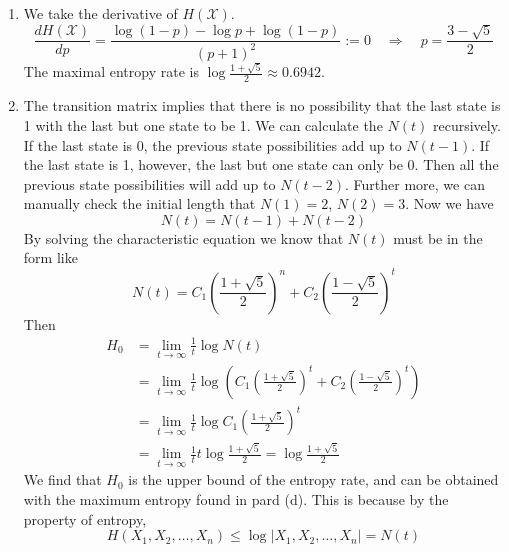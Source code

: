\begin{exercise}
\begin{solution}
\begin{enumerate}
{    }
    \item { We take the derivative of $H(\mathcal{X})$.
    \begin{equation}
        \frac{d H(\mathcal{X})}{dp} = \frac{\log(1-p) -\log p+\log(1-p)}{(p+1)^2} := 0 \quad 
        \Rightarrow \quad p =  \frac{3- \sqrt{5}}{2}
    \end{equation}
    The maximal entropy rate is $\log \frac{1+\sqrt{5}}{2} \approx 0.6942$.
    }
    \item {
      The transition matrix implies that there is no possibility that the last state is 1 with the last but one state to be 1. We can calculate the $N(t)$ recursively. If the last state is 0, the previous state possibilities add up to $N(t-1)$. If the last state is 1, however, the last but one state can only be 0. Then all the previous state possibilities will add up to $N(t-2)$. Further more, we can manually check the initial length that $N(1) = 2$, $N(2) = 3$. Now we have 
      \begin{equation}
        N(t) = N(t-1) + N(t-2)
      \end{equation}
      By solving the characteristic equation we know that $N(t)$ must be in the form like
      \begin{equation}
        N(t) = C_1 (\frac{1+\sqrt{5}}{2})^n + C_2 (\frac{1-\sqrt{5}}{2})^t
      \end{equation}
      Then
      \begin{equation}
        \begin{aligned}
          H_{0} &=\lim _{t \rightarrow \infty} \frac{1}{t} \log N(t) \\
          &= \lim _{t \rightarrow \infty} \frac{1}{t} \log \left(C_1 (\frac{1+\sqrt{5}}{2})^t + C_2 (\frac{1-\sqrt{5}}{2})^t\right) \\
          &= \lim _{t \rightarrow \infty} \frac{1}{t} \log C_1 (\frac{1+\sqrt{5}}{2})^t \\
          &= \lim _{t \rightarrow \infty} \frac{1}{t} t \log \frac{1+\sqrt{5}}{2} = \log \frac{1+\sqrt{5}}{2}
        \end{aligned}
      \end{equation}
      We find that $H_0$ is the upper bound of the entropy rate, and can be obtained with the maximum entropy found in pard (d). This is because by the property of entropy,
      \begin{equation}
        H\left(X_{1}, X_{2}, \ldots, X_{n}\right) \le \log |X_{1}, X_{2}, \ldots, X_{n}| = N(t)
      \end{equation}
    }
  \end{enumerate}
  \end{solution}
  \label{ex10}
\end{exercise}

